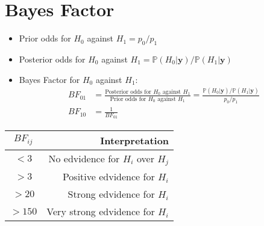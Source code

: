 \documentclass[12pt]{article}
\theoremstyle{definition}
\newcommand{\Prob}[1]{\mathbb{P}(#1)}
\begin{document}
\section*{Bayes Factor}
\begin{itemize}
    \item Prior odds for $H_0$ against $H_1 = {p_0}/{p_1}$
    \item Posterior odds for $H_0$ against $H_1 = \Prob{H_0|\bm{y}}/\Prob{H_1|\bm{y}}$
    \item Bayes Factor for $H_0$ against $H_1$:
        \begin{align*}
            BF_{01} &= \frac{\text{Posterior odds for $H_0$ against $H_1$}}{\text{Prior odds for $H_0$ against $H_1$}} = \frac{\Prob{H_0|\bm{y}}/\Prob{H_1|\bm{y}}}{p_0/p_1}\\
            BF_{10} &= \frac{1}{BF_{01}}
        \end{align*}
\end{itemize}
\begin{center}
    \begin{tabular}{|c|r|}
        \hline
        $BF_{ij}$ & Interpretation\\
        \hline\hline
        $<3$ & No edvidence for $H_i$ over $H_j$\\
        $>3$ & Positive edvidence for $H_i$\\
        $>20$ & Strong edvidence for $H_i$\\
        $>150$ & Very strong edvidence for $H_i$\\\hline
    \end{tabular}
\end{center}
\end{document}
